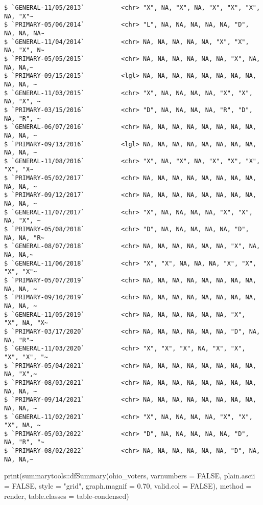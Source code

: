 \documentclass[
  letterpaper,
  DIV=11,
  numbers=noendperiod]{scrartcl}
\newenvironment{Shaded}{\begin{snugshade}}{\end{snugshade}}
\newcommand{\AttributeTok}[1]{\textcolor[rgb]{0.40,0.45,0.13}{#1}}
\newcommand{\ConstantTok}[1]{\textcolor[rgb]{0.56,0.35,0.01}{#1}}
\newcommand{\FloatTok}[1]{\textcolor[rgb]{0.68,0.00,0.00}{#1}}
\newcommand{\FunctionTok}[1]{\textcolor[rgb]{0.28,0.35,0.67}{#1}}
\newcommand{\NormalTok}[1]{\textcolor[rgb]{0.00,0.23,0.31}{#1}}
\newcommand{\SpecialCharTok}[1]{\textcolor[rgb]{0.37,0.37,0.37}{#1}}
\newcommand{\StringTok}[1]{\textcolor[rgb]{0.13,0.47,0.30}{#1}}
\begin{document}
\begin{verbatim}
$ `GENERAL-11/05/2013`          <chr> "X", NA, "X", NA, "X", "X", "X", NA, "X"~
$ `PRIMARY-05/06/2014`          <chr> "L", NA, NA, NA, NA, NA, "D", NA, NA, NA~
$ `GENERAL-11/04/2014`          <chr> NA, NA, NA, NA, NA, "X", "X", NA, "X", N~
$ `PRIMARY-05/05/2015`          <chr> NA, NA, NA, NA, NA, NA, "X", NA, NA, NA,~
$ `PRIMARY-09/15/2015`          <lgl> NA, NA, NA, NA, NA, NA, NA, NA, NA, NA, ~
$ `GENERAL-11/03/2015`          <chr> "X", NA, NA, NA, NA, "X", "X", NA, "X", ~
$ `PRIMARY-03/15/2016`          <chr> "D", NA, NA, NA, NA, "R", "D", NA, "R", ~
$ `GENERAL-06/07/2016`          <chr> NA, NA, NA, NA, NA, NA, NA, NA, NA, NA, ~
$ `PRIMARY-09/13/2016`          <lgl> NA, NA, NA, NA, NA, NA, NA, NA, NA, NA, ~
$ `GENERAL-11/08/2016`          <chr> "X", NA, "X", NA, "X", "X", "X", "X", "X~
$ `PRIMARY-05/02/2017`          <chr> NA, NA, NA, NA, NA, NA, NA, NA, NA, NA, ~
$ `PRIMARY-09/12/2017`          <chr> NA, NA, NA, NA, NA, NA, NA, NA, NA, NA, ~
$ `GENERAL-11/07/2017`          <chr> "X", NA, NA, NA, NA, "X", "X", NA, "X", ~
$ `PRIMARY-05/08/2018`          <chr> "D", NA, NA, NA, NA, NA, "D", NA, NA, "R~
$ `GENERAL-08/07/2018`          <chr> NA, NA, NA, NA, NA, NA, "X", NA, NA, NA,~
$ `GENERAL-11/06/2018`          <chr> "X", "X", NA, NA, NA, "X", "X", "X", "X"~
$ `PRIMARY-05/07/2019`          <chr> NA, NA, NA, NA, NA, NA, NA, NA, NA, NA, ~
$ `PRIMARY-09/10/2019`          <chr> NA, NA, NA, NA, NA, NA, NA, NA, NA, NA, ~
$ `GENERAL-11/05/2019`          <chr> NA, NA, NA, NA, NA, NA, "X", "X", NA, "X~
$ `PRIMARY-03/17/2020`          <chr> NA, NA, NA, NA, NA, NA, "D", NA, NA, "R"~
$ `GENERAL-11/03/2020`          <chr> "X", "X", "X", NA, "X", "X", "X", "X", "~
$ `PRIMARY-05/04/2021`          <chr> NA, NA, NA, NA, NA, NA, NA, NA, NA, "X",~
$ `PRIMARY-08/03/2021`          <chr> NA, NA, NA, NA, NA, NA, NA, NA, NA, NA, ~
$ `PRIMARY-09/14/2021`          <chr> NA, NA, NA, NA, NA, NA, NA, NA, NA, NA, ~
$ `GENERAL-11/02/2021`          <chr> "X", NA, NA, NA, NA, "X", "X", "X", NA, ~
$ `PRIMARY-05/03/2022`          <chr> "D", NA, NA, NA, NA, NA, "D", NA, "R", "~
$ `PRIMARY-08/02/2022`          <chr> NA, NA, NA, NA, NA, NA, "D", NA, NA, NA,~
\end{verbatim}

\begin{Shaded}
\begin{Highlighting}[]
\FunctionTok{print}\NormalTok{(summarytools}\SpecialCharTok{::}\FunctionTok{dfSummary}\NormalTok{(ohio\_voters,}
                        \AttributeTok{varnumbers =} \ConstantTok{FALSE}\NormalTok{,}
                        \AttributeTok{plain.ascii  =} \ConstantTok{FALSE}\NormalTok{, }
                        \AttributeTok{style        =} \StringTok{"grid"}\NormalTok{, }
                        \AttributeTok{graph.magnif =} \FloatTok{0.70}\NormalTok{, }
                        \AttributeTok{valid.col    =} \ConstantTok{FALSE}\NormalTok{),}
      \AttributeTok{method =} \StringTok{\textquotesingle{}render\textquotesingle{}}\NormalTok{,}
      \AttributeTok{table.classes =} \StringTok{\textquotesingle{}table{-}condensed\textquotesingle{}}\NormalTok{)}
\end{Highlighting}
\end{Shaded}
\end{document}
